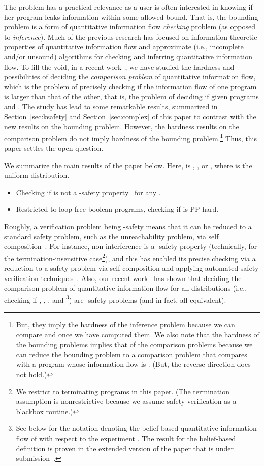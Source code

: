 \documentclass{llncs}
\begin{document}
The problem has a practical relevance as a user is often interested in
knowing if her program leaks information within some allowed bound.
That is, the bounding problem is a form of quantitative information
flow {\em checking} problem (as opposed to {\em inference}).  Much of
the previous research has focused on information theoretic properties
of quantitative information flow and approximate (i.e., incomplete
and/or unsound) algorithms for checking and inferring quantitative
information flow.  To fill the void, in a recent
work~\cite{DBLP:conf/csfw/yasuoka2010}, we have studied the hardness
and possibilities of deciding the {\em comparison problem} of
quantitative information flow, which is the problem of precisely
checking if the information flow of one program is larger than that of
the other, that is, the problem of deciding if  given programs  and .  The study has lead
to some remarkable results, summarized in Section~\ref{sec:ksafety}
and Section~\ref{sec:complex} of this paper to contrast with the new
results on the bounding problem.  However, the hardness results on the
comparison problem do not imply hardness of the bounding
problem.\footnote{But, they imply the hardness of the inference
  problem because we can compare  and
   once we have computed them.  We also note
    that the hardness of the bounding problems implies that of the
    comparison problems because we can reduce the bounding problem
     to a comparison problem that compares 
    with a program whose information flow is .  (But, the reverse
    direction does not hold.)}  Thus, this paper settles the open
question.

We summarize the main results of the paper below.  Here, 
is , ,  or , where 
is the uniform distribution.
\begin{itemize}
\item Checking if  is not a -safety
  property~\cite{terauchi:sas05,DBLP:conf/csfw/ClarksonS08} for any .
\item Restricted to loop-free boolean programs, checking if
 is PP-hard.
\end{itemize}
Roughly, a verification problem being -safety means that it can be
reduced to a standard safety problem, such as the unreachability
problem, via self composition~\cite{barthe:csfw04,darvas:spc05}.  For
instance, non-interference is a -safety property (technically, for
the termination-insensitive case\footnote{We restrict to terminating
  programs in this paper.  (The termination assumption is
  nonrestrictive because we assume safety verification as a blackbox
  routine.)}), and this has enabled its precise checking via a
reduction to a safety problem via self composition and applying
automated safety verification
techniques~\cite{terauchi:sas05,naumann:esorics06,unno:plas2006}.
Also, our recent work~\cite{DBLP:conf/csfw/yasuoka2010} has shown that
deciding the comparison problem of quantitative information flow for
all distributions (i.e., checking if , , , and \footnote{See below for the notation
   denoting the belief-based
  quantitative information flow of  with respect to the experiment
  .  The result for the belief-based definition is
  proven in the extended version of the paper that is under
  submission~\cite{yasuoka:toplas2010submit}.}) are -safety problems
(and in fact, all equivalent).
\end{document}
